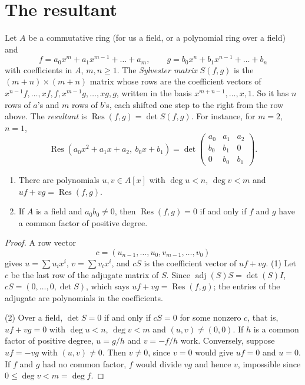 \section{The resultant}

Let $A$ be a commutative ring (for us a field, or a polynomial ring over a field) and
\[
f=a_0x^m+a_1x^{m-1}+\dots+a_m,\qquad g=b_0x^n+b_1x^{n-1}+\dots+b_n
\]
with coefficients in $A$, $m,n\ge1$. The \emph{Sylvester matrix} $S(f,g)$ is the $(m+n)\times(m+n)$ matrix whose rows are the coefficient vectors of
$x^{n-1}f,\dots,xf,f,x^{m-1}g,\dots,xg,g$, written in the basis $x^{m+n-1},\dots,x,1$. So it has $n$ rows of $a$'s and $m$ rows of $b$'s, each shifted one
step to the right from the row above. The \emph{resultant} is $\operatorname{Res}(f,g)=\det S(f,g)$. For instance, for $m=2$, $n=1$,
\[
\operatorname{Res}(a_0x^2+a_1x+a_2,\ b_0x+b_1)=\det\begin{pmatrix}a_0&a_1&a_2\\b_0&b_1&0\\0&b_0&b_1\end{pmatrix}.
\]

\begin{proposition}\label{geometry:prop:resultant}
\begin{enumerate}
\item There are polynomials $u,v\in A[x]$ with $\deg u<n$, $\deg v<m$ and $uf+vg=\operatorname{Res}(f,g)$.
\item If $A$ is a field and $a_0b_0\ne0$, then $\operatorname{Res}(f,g)=0$ if and only if $f$ and $g$ have a common factor of positive degree.
\end{enumerate}
\end{proposition}

\begin{proof}
A row vector
\[
c=(u_{n-1},\dots,u_0,v_{m-1},\dots,v_0)
\]
gives $u=\sum u_ix^i$, $v=\sum v_ix^i$, and $cS$ is the coefficient vector of $uf+vg$. (1) Let
$c$ be the last row of the adjugate matrix of $S$. Since $\operatorname{adj}(S)S=\det(S)I$, $cS=(0,\dots,0,\det S)$, which says
$uf+vg=\operatorname{Res}(f,g)$; the entries of the adjugate are polynomials in the coefficients.

(2) Over a field, $\det S=0$ if and only if $cS=0$ for some nonzero $c$, that is, $uf+vg=0$ with $\deg u<n$, $\deg v<m$ and $(u,v)\ne(0,0)$. If $h$ is
a common factor of positive degree, $u=g/h$ and $v=-f/h$ work. Conversely, suppose $uf=-vg$ with $(u,v)\ne0$. Then $v\ne0$, since $v=0$ would give
$uf=0$ and $u=0$. If $f$ and $g$ had no common factor, $f$ would divide $vg$ and hence $v$, impossible since $0\le\deg v<m=\deg f$.
\end{proof}


